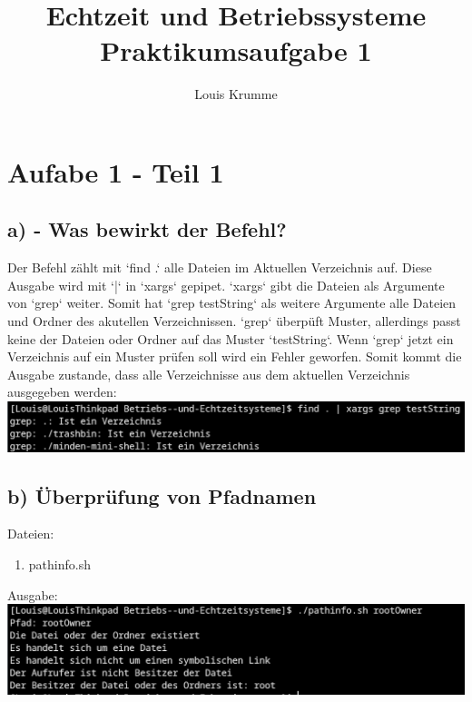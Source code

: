 \documentclass[a4paper,10pt]{article}
\title{Echtzeit und Betriebssysteme Praktikumsaufgabe 1}
\author{Louis Krumme}
\begin{document}
\maketitle

\section{Aufabe 1 - Teil 1}
\subsection{a) - Was bewirkt der Befehl?}
Der Befehl zählt mit `find .` alle Dateien im Aktuellen Verzeichnis auf. Diese Ausgabe wird mit `|` in `xargs` gepipet. `xargs` gibt die Dateien als Argumente von `grep` weiter. Somit hat `grep testString` als weitere Argumente alle Dateien und Ordner des akutellen Verzeichnissen. `grep` überpüft Muster, allerdings passt keine der Dateien oder Ordner auf das Muster `testString`. Wenn `grep` jetzt ein Verzeichnis auf ein Muster prüfen soll wird ein Fehler geworfen. Somit kommt die Ausgabe zustande, dass alle Verzeichnisse aus dem aktuellen Verzeichnis ausgegeben werden: \\

\includegraphics[width=1\textwidth]{befehl.png}

\subsection{b) Überprüfung von Pfadnamen}
Dateien:
\begin{enumerate}
 \item pathinfo.sh
\end{enumerate}
Ausgabe: \\
\includegraphics[width=1\textwidth]{pathinfo_ausgabe.png}
\end{document}

